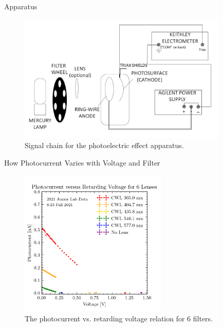 \documentclass[hyperref=pdftex, presentation]{beamer}
\begin{document}
\begin{frame}{Apparatus}
\begin{figure}
	\centering
	\includegraphics[width=10cm]{apparatus_setup.png}
	\caption{Signal chain for the photoelectric effect apparatus.}
\end{figure}
\end{frame}


\begin{frame}{How Photocurrent Varies with Voltage and Filter}
 \begin{figure}
  \centering
  \includegraphics[height=7cm]{all_lenses_scatter.png}
  \caption{The photocurrent vs. retarding voltage relation for 6 filters. }
 \end{figure}
\end{frame}
\end{document}
